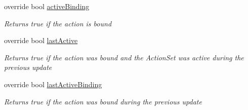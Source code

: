 \begin{DoxyCompactItemize}
override bool \mbox{\hyperlink{class_valve_1_1_v_r_1_1_steam_v_r___action___vector2___source_a265c1b9f10bba1a6b73e205250aa67b1}{active\+Binding}}
\begin{DoxyCompactList}\small\item\em Returns true if the action is bound \end{DoxyCompactList}\item 
override bool \mbox{\hyperlink{class_valve_1_1_v_r_1_1_steam_v_r___action___vector2___source_aabe8a5fe1698bf1bfc323f4f4ee1662c}{last\+Active}}
\begin{DoxyCompactList}\small\item\em Returns true if the action was bound and the Action\+Set was active during the previous update \end{DoxyCompactList}\item 
override bool \mbox{\hyperlink{class_valve_1_1_v_r_1_1_steam_v_r___action___vector2___source_a2d4c806995d691a67313e46853e19f92}{last\+Active\+Binding}}
\begin{DoxyCompactList}\small\item\em Returns true if the action was bound during the previous update \end{DoxyCompactList}\end{DoxyCompactItemize}
